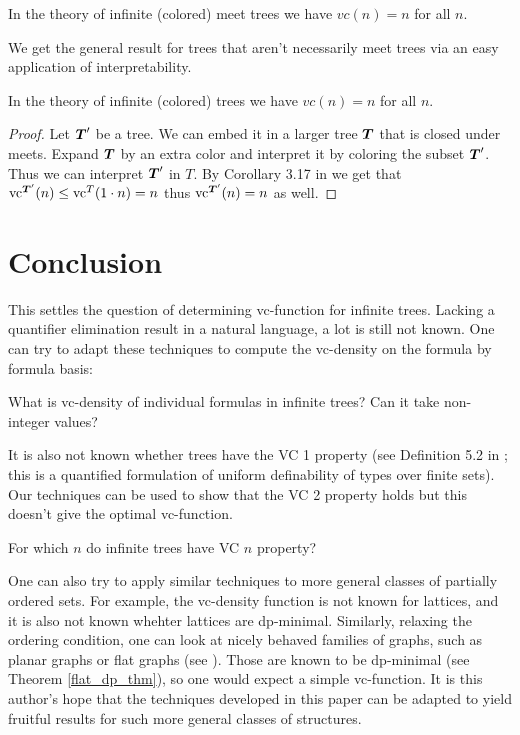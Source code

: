 \begin{Corollary}
  In the theory of infinite (colored) meet trees we have $vc(n) = n$ for all $n$.
\end{Corollary}
We get the general result for trees that aren't necessarily meet trees via an easy application of interpretability.
\begin{Corollary}
  In the theory of infinite (colored) trees we have $vc(n) = n$ for all $n$.
\end{Corollary}
\begin{proof}
  Let $\operatorname{\boldsymbol T}'$ be a tree. We can embed it in a larger tree $\operatorname{\boldsymbol T}$ that is closed under meets. Expand $\operatorname{\boldsymbol T}$ by an extra color and interpret it by coloring the subset $\operatorname{\boldsymbol T}'$. Thus we can interpret $\operatorname{\boldsymbol T}'$ in $T$. By Corollary 3.17 in \cite{density} we get that $\operatorname{vc}^{\operatorname{\boldsymbol T}'}(n) \leq \operatorname{vc}^T(1 \cdot n) = n$ thus $\operatorname{vc}^{\operatorname{\boldsymbol T}'}(n) = n$ as well.
\end{proof}

\section{Conclusion}
This settles the question of determining vc-function for infinite trees.
Lacking a quantifier elimination result in a natural language, a lot is still not known.
One can try to adapt these techniques to compute the vc-density on the formula by formula basis:
\begin{openq}
  What is vc-density of individual formulas in infinite trees?
  Can it take non-integer values?
\end{openq}
It is also not known whether trees have the VC 1 property
(see Definition 5.2 in \cite{density}; this is a quantified formulation of uniform definability of types over finite sets).
Our techniques can be used to show that the VC 2 property holds but this doesn't give the optimal vc-function.
\begin{openq}
  For which $n$ do infinite trees have VC $n$ property?
\end{openq}
One can also try to apply similar techniques to more general classes of partially ordered sets.
For example, the vc-density function is not known for lattices, and it is also not known whehter lattices are dp-minimal.
Similarly, relaxing the ordering condition,
one can look at nicely behaved families of graphs, such as planar graphs or flat graphs (see \cite{stable_graphs}).
Those are known to be dp-minimal (see Theorem \ref{flat_dp_thm}), so one would expect a simple vc-function.
It is this author's hope that the techniques developed in this paper can be adapted
to yield fruitful results for such more general classes of structures.